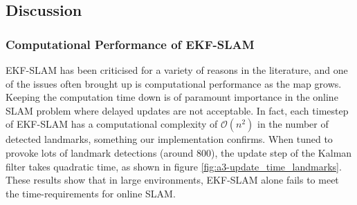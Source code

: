 \subsection{Discussion}
\subsubsection{Computational Performance of EKF-SLAM}
EKF-SLAM has been criticised for a variety of reasons in the literature, and one of the issues often brought up is computational performance as the map grows. Keeping the computation time down is of paramount importance in the online SLAM problem where delayed updates are not acceptable. In fact, each timestep of EKF-SLAM has a computational complexity of $\mathcal{O}(n^2)$ in the number of detected landmarks\cite{divideandconq}, something our implementation confirms. When tuned to provoke lots of landmark detections (around 800), the update step of the Kalman filter takes quadratic time, as shown in figure \ref{fig:a3-update_time_landmarks}. These results show that in large environments, EKF-SLAM alone fails to meet the time-requirements for online SLAM.

